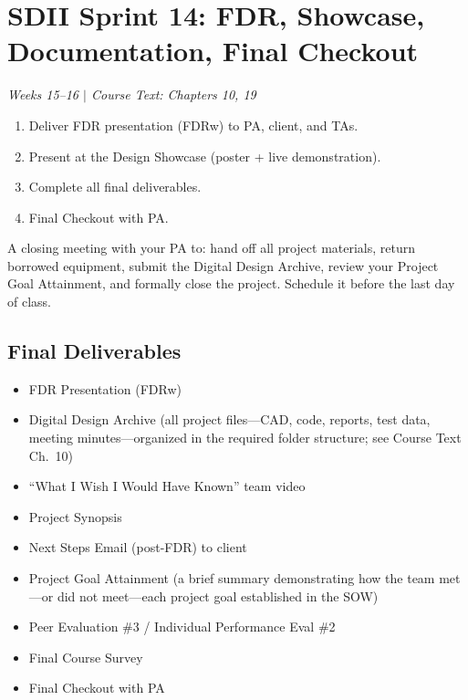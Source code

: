 \section{SDII Sprint 14: FDR, Showcase, Documentation, Final Checkout}
\textit{Weeks 15--16 $|$ Course Text: Chapters 10, 19}

\begin{priorities}
\begin{enumerate}[nosep]
\item Deliver FDR presentation (FDRw) to PA, client, and TAs.
\item Present at the Design Showcase (poster + live demonstration).
\item Complete all final deliverables.
\item Final Checkout with PA.
\end{enumerate}
\end{priorities}

\begin{faqbox}
A closing meeting with your PA to: hand off all project materials, return borrowed equipment, submit the Digital Design Archive, review your Project Goal Attainment, and formally close the project. Schedule it before the last day of class.
\end{faqbox}

\subsection{Final Deliverables}
\begin{itemize}[nosep,leftmargin=1.5em]
\item FDR Presentation (FDRw)
\item Digital Design Archive (all project files---CAD, code, reports, test data, meeting minutes---organized in the required folder structure; see Course Text Ch.~10)
\item ``What I Wish I Would Have Known'' team video
\item Project Synopsis
\item Next Steps Email (post-FDR) to client
\item Project Goal Attainment (a brief summary demonstrating how the team met---or did not meet---each project goal established in the SOW)
\item Peer Evaluation \#3 / Individual Performance Eval \#2
\item Final Course Survey
\item Final Checkout with PA
\end{itemize}


